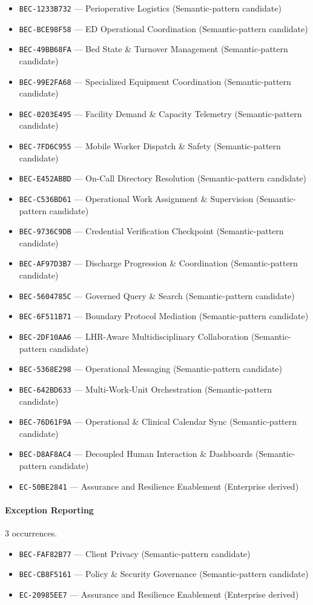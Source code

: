 \documentclass[11pt,a4paper,openany]{book}
\begin{document}
\begin{itemize}
\item \texttt{BEC-1233B732} --- Perioperative Logistics (Semantic-pattern candidate)
\item \texttt{BEC-BCE98F58} --- ED Operational Coordination (Semantic-pattern candidate)
\item \texttt{BEC-49BB68FA} --- Bed State \& Turnover Management (Semantic-pattern candidate)
\item \texttt{BEC-99E2FA68} --- Specialized Equipment Coordination (Semantic-pattern candidate)
\item \texttt{BEC-0203E495} --- Facility Demand \& Capacity Telemetry (Semantic-pattern candidate)
\item \texttt{BEC-7FD6C955} --- Mobile Worker Dispatch \& Safety (Semantic-pattern candidate)
\item \texttt{BEC-E452ABBD} --- On-Call Directory Resolution (Semantic-pattern candidate)
\item \texttt{BEC-C536BD61} --- Operational Work Assignment \& Supervision (Semantic-pattern candidate)
\item \texttt{BEC-9736C9DB} --- Credential Verification Checkpoint (Semantic-pattern candidate)
\item \texttt{BEC-AF97D3B7} --- Discharge Progression \& Coordination (Semantic-pattern candidate)
\item \texttt{BEC-5604785C} --- Governed Query \& Search (Semantic-pattern candidate)
\item \texttt{BEC-6F511B71} --- Boundary Protocol Mediation (Semantic-pattern candidate)
\item \texttt{BEC-2DF10AA6} --- LHR-Aware Multidisciplinary Collaboration (Semantic-pattern candidate)
\item \texttt{BEC-5368E298} --- Operational Messaging (Semantic-pattern candidate)
\item \texttt{BEC-642BD633} --- Multi-Work-Unit Orchestration (Semantic-pattern candidate)
\item \texttt{BEC-76D61F9A} --- Operational \& Clinical Calendar Sync (Semantic-pattern candidate)
\item \texttt{BEC-D8AF8AC4} --- Decoupled Human Interaction \& Dashboards (Semantic-pattern candidate)
\item \texttt{EC-50BE2841} --- Assurance and Resilience Enablement (Enterprise derived)
\end{itemize}
\paragraph{Exception Reporting} 3 occurrences.\par
\begin{itemize}
\item \texttt{BEC-FAF82B77} --- Client Privacy (Semantic-pattern candidate)
\item \texttt{BEC-CB8F5161} --- Policy \& Security Governance (Semantic-pattern candidate)
\item \texttt{EC-20985EE7} --- Assurance and Resilience Enablement (Enterprise derived)
\end{itemize}
\end{document}
